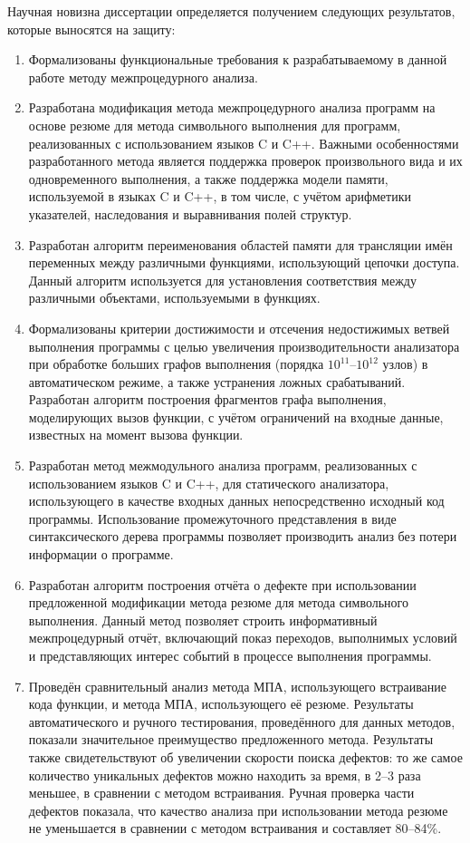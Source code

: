 Научная новизна диссертации определяется получением следующих результатов, которые выносятся на защиту:
\begin{enumerate}[leftmargin=1em]
  \item Формализованы функциональные требования к разрабатываемому в данной работе методу межпроцедурного анализа.
  \item Разработана модификация метода межпроцедурного анализа программ на основе резюме для метода символьного выполнения для программ, реализованных с использованием языков C и C++. Важными особенностями разработанного метода является поддержка проверок произвольного вида и их одновременного выполнения, а также поддержка модели памяти, используемой в языках C и C++, в том числе, с учётом арифметики указателей, наследования и выравнивания полей структур.
  \item Разработан алгоритм переименования областей памяти для трансляции имён переменных между различными функциями, использующий цепочки доступа. Данный алгоритм используется для установления соответствия между различными объектами, используемыми в функциях.
  \item Формализованы критерии достижимости и отсечения недостижимых ветвей выполнения программы с целью увеличения производительности анализатора при обработке больших графов выполнения (порядка $10^{11}$--$10^{12}$ узлов) в автоматическом режиме, а также устранения ложных срабатываний. Разработан алгоритм построения фрагментов графа выполнения, моделирующих вызов функции, с учётом ограничений на входные данные, известных на момент вызова функции. 
  \item Разработан метод межмодульного анализа программ, реализованных с использованием языков C и C++, для статического анализатора, использующего в качестве входных данных непосредственно исходный код программы. Использование промежуточного представления в виде синтаксического дерева программы позволяет производить анализ без потери информации о программе.
  \item Разработан алгоритм построения отчёта о дефекте при использовании предложенной модификации метода резюме для метода символьного выполнения. Данный метод позволяет строить информативный межпроцедурный отчёт, включающий показ переходов, выполнимых условий и представляющих интерес событий в процессе выполнения программы.
  \item Проведён сравнительный анализ метода МПА, использующего встраивание кода функции, и метода МПА, использующего её резюме. Результаты автоматического и ручного тестирования, проведённого для данных методов, показали значительное преимущество предложенного метода. Результаты также свидетельствуют об увеличении скорости поиска дефектов: то же самое количество уникальных дефектов можно находить за время, в 2--3 раза меньшее, в сравнении с методом встраивания. Ручная проверка части дефектов показала, что качество анализа при использовании метода резюме не уменьшается в сравнении с методом встраивания и составляет 80--84\%.


\end{enumerate}

